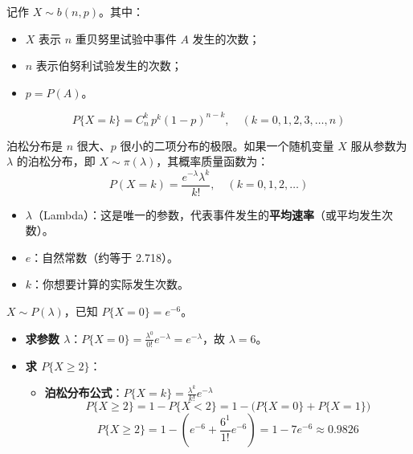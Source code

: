 \begin{definition}[二项分布]
记作 $X \sim b(n, p)$。其中：
\begin{itemize}
	\item $X$ 表示 $n$ 重贝努里试验中事件 $A$ 发生的次数；
	\item $n$ 表示伯努利试验发生的次数；
	\item $p = P(A)$。
\end{itemize}
\begin{equation}
	P\{X = k\} = C_n^k\, p^k (1 - p)^{n - k}, \quad (k = 0, 1, 2, 3, \dots, n)
	\label{eq:第二章:二项分布}
\end{equation}
\end{definition}

\begin{definition}[泊松分布]
泊松分布是 $n$ 很大、$p$ 很小的二项分布的极限。如果一个随机变量 $X$ 服从参数为 $\lambda$ 的泊松分布，即 $X \sim \pi(\lambda)$，其概率质量函数为：
\begin{equation}
	P(X = k) = \frac{e^{-\lambda} \lambda^k}{k!}, \quad (k = 0, 1, 2, \dots)
	\label{eq:第二章:泊松分布}
\end{equation}
\begin{itemize}
	\item $\lambda$（Lambda）：这是唯一的参数，代表事件发生的\textbf{平均速率}（或平均发生次数）。
	\item $e$：自然常数（约等于 2.718）。
	\item $k$：你想要计算的实际发生次数。
\end{itemize}
\end{definition}

\begin{example}
$X \sim P(\lambda)$，已知 $P\{X=0\} = e^{-6}$。
\begin{itemize}
	\item \textbf{求参数 $\lambda$}：$P\{X=0\} = \frac{\lambda^{0}}{0!} e^{-\lambda} = e^{-\lambda}$，故 $\lambda = 6$。
	\item \textbf{求 $P\{X \ge 2\}$}：
	\begin{itemize}
		\item \textbf{泊松分布公式}：$P\{X=k\} = \frac{\lambda^{k}}{k!} e^{-\lambda}$
		\begin{equation}
			P\{X \ge 2\} = 1 - P\{X < 2\} = 1 - \big(P\{X=0\} + P\{X=1\}\big)
			\label{eq:第二章:泊松例1}
		\end{equation}
		\begin{equation}
			P\{X \ge 2\} = 1 - \left(e^{-6} + \frac{6^{1}}{1!} e^{-6}\right) = 1 - 7 e^{-6} \approx 0.9826
			\label{eq:第二章:泊松例2}
		\end{equation}
	\end{itemize}
\end{itemize}
\end{example}

